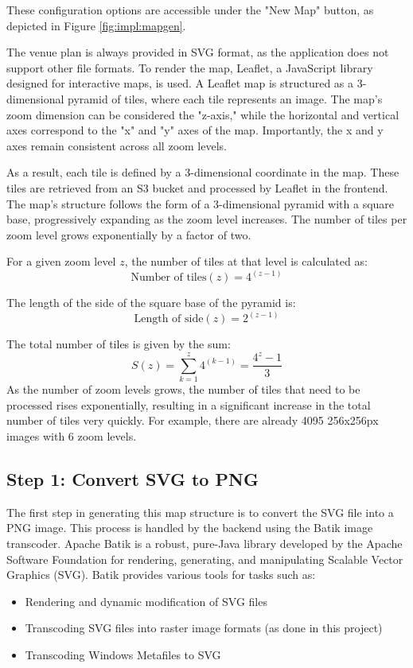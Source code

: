 These configuration options are accessible under the "New Map" button, as depicted in Figure \ref{fig:impl:mapgen}.

The venue plan is always provided in SVG format, as the application does not support other file formats. To render the map, Leaflet, a JavaScript library designed for interactive maps, is used. A Leaflet map is structured as a 3-dimensional pyramid of tiles, where each tile represents an image. The map's zoom dimension can be considered the "z-axis," while the horizontal and vertical axes correspond to the "x" and "y" axes of the map. Importantly, the x and y axes remain consistent across all zoom levels.

As a result, each tile is defined by a 3-dimensional coordinate in the map. These tiles are retrieved from an S3 bucket and processed by Leaflet in the frontend. The map's structure follows the form of a 3-dimensional pyramid with a square base, progressively expanding as the zoom level increases. The number of tiles per zoom level grows exponentially by a factor of two.

For a given zoom level \( z \), the number of tiles at that level is calculated as:
\[
\text{Number of tiles}(z) = 4^{(z-1)}
\]

The length of the side of the square base of the pyramid is:
\[
\text{Length of side}(z) = 2^{(z-1)}
\]

The total number of tiles is given by the sum:
\[
S(z) = \sum_{k=1}^{z} 4^{(k-1)} = \frac{4^z - 1}{3}
\]
As the number of zoom levels grows, the number of tiles that need to be processed rises exponentially, resulting in a significant increase in the total number of tiles very quickly. For example, there are already 4095 256x256px images with 6 zoom levels.

\subsection{Step 1: Convert SVG to PNG}

The first step in generating this map structure is to convert the SVG file into a PNG image. This process is handled by the backend using the Batik image transcoder. Apache Batik is a robust, pure-Java library developed by the Apache Software Foundation for rendering, generating, and manipulating Scalable Vector Graphics (SVG). Batik provides various tools for tasks such as:

\begin{itemize} \item Rendering and dynamic modification of SVG files \item Transcoding SVG files into raster image formats (as done in this project) \item Transcoding Windows Metafiles to SVG \end{itemize}

